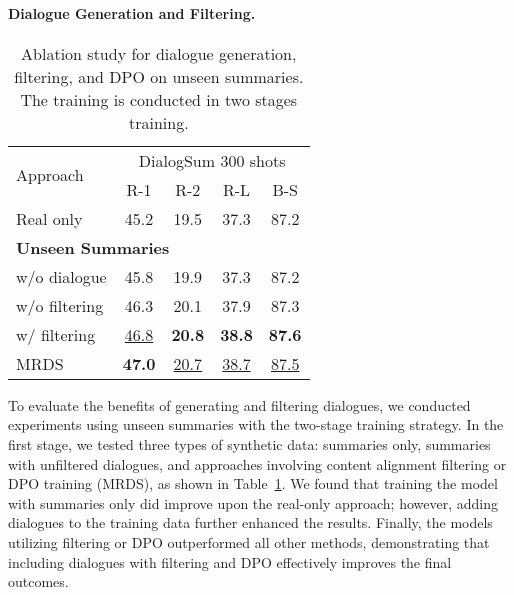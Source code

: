 \paragraph{Dialogue Generation and Filtering.}

\begin{table}[ht]
\centering
\caption{Ablation study for dialogue generation, filtering, and DPO on unseen summaries. The training is conducted in two stages training.}
\label{tab:filter}
\begin{tabular}{lcccc}
\toprule
\multirow{2}{*}{Approach}  & \multicolumn{4}{c}{DialogSum 300 shots}  \\
\cmidrule(lr){2-5} 
& R-1 & R-2 & R-L & B-S   \\
\midrule
Real only & 45.2 & 19.5 & 37.3 & 87.2  \\
\midrule
\multicolumn{5}{l}{\textbf{Unseen Summaries}} \\
\midrule
w/o dialogue  & 45.8 & 19.9 & 37.3 & 87.2 \\
w/o filtering & 46.3 & 20.1 & 37.9 & 87.3 \\
w/ filtering &  \underline{46.8} & \textbf{20.8} & \textbf{38.8}  & \textbf{87.6}  \\
\midrule
MRDS & \textbf{47.0} & \underline{20.7} & \underline{38.7} & \underline{87.5}  \\
\bottomrule
\end{tabular}
\end{table}

To evaluate the benefits of generating and filtering dialogues, we conducted experiments using unseen summaries with the two-stage training strategy. In the first stage, we tested three types of synthetic data: summaries only, summaries with unfiltered dialogues, and approaches involving content alignment filtering or DPO training (MRDS), as shown in Table~\ref{tab:filter}. We found that training the model with summaries only did improve upon the real-only approach; however, adding dialogues to the training data further enhanced the results. Finally, the models utilizing filtering or DPO outperformed all other methods, demonstrating that including dialogues with filtering and DPO effectively improves the final outcomes.








